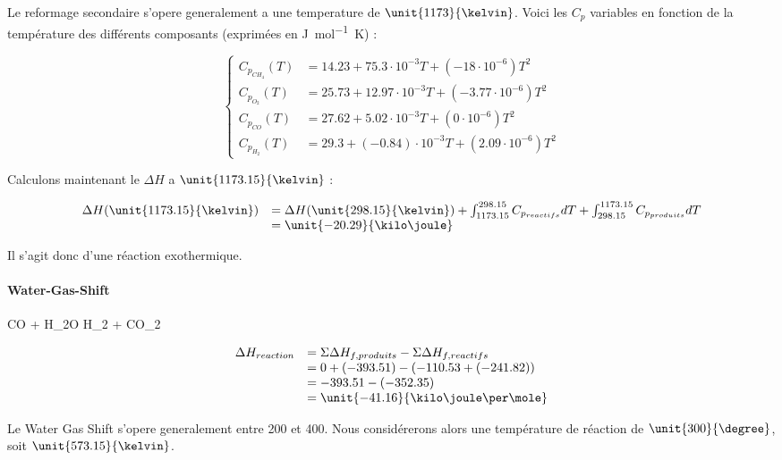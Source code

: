 Le reformage secondaire s'opere generalement a une temperature de $\unit{1173}{\kelvin}$.
Voici les $C_p$ variables en fonction de la température des différents composants\cite{hc-table} 
(exprimées en \unit{\joule\per\mole\kelvin}) :

$$
	\left\{
		\begin{array}{rl}
			C_{p_{CH_4}}(T) 	&= 14.23 + 75.3\cdot10^{-3}T + (-18\cdot10^{-6})T^2 \\
			C_{p_{O_2}}(T) 		&= 25.73 + 12.97\cdot10^{-3}T + (-3.77\cdot10^{-6})T^2 \\
			C_{p_{CO}}(T) 		&= 27.62 + 5.02\cdot10^{-3}T + (0\cdot10^{-6})T^2 \\
			C_{p_{H_2}}(T) 		&= 29.3 + (-0.84)\cdot10^{-3}T + (2.09\cdot10^{-6})T^2
		\end{array}
	\right.
$$

Calculons maintenant le $\Delta H$ a $\unit{1173.15}{\kelvin}$ :

$$
	\begin{array}{rl}
		 	\Delta H(\unit{1173.15}{\kelvin}) &=  \Delta H(\unit{298.15}{\kelvin}) 
																						+ \int_{1173.15}^{298.15} C_{p_{reactifs}} dT + \int_{298.15}^{1173.15} 
																						C_{p_{produits}} dT \\
																				&=  \unit{-20.29}{\kilo\joule}
	\end{array}
$$	

Il s'agit donc d'une réaction exothermique.

\paragraph{Water-Gas-Shift}

\begin{chemmath}
		CO + H_2O \Longrightarrow H_2 + CO_2
\end{chemmath}	

$$
	\begin{array}{rl}
	\Delta H_{reaction}		&= \Sigma \Delta H_{f,produits} - \Sigma \Delta H_{f,reactifs} \\
												&= 0 + (-393.51) - (-110.53 + (-241.82)) \\
												&= -393.51 - (-352.35) \\
												&= \unit{-41.16}{\kilo\joule\per\mole}
	\end{array}
$$

Le Water Gas Shift s'opere generalement entre 200 et \unit{400}{\degree}. Nous considérerons
alors une température de réaction de $\unit{300}{\degree}$, soit $\unit{573.15}{\kelvin}$.
						
